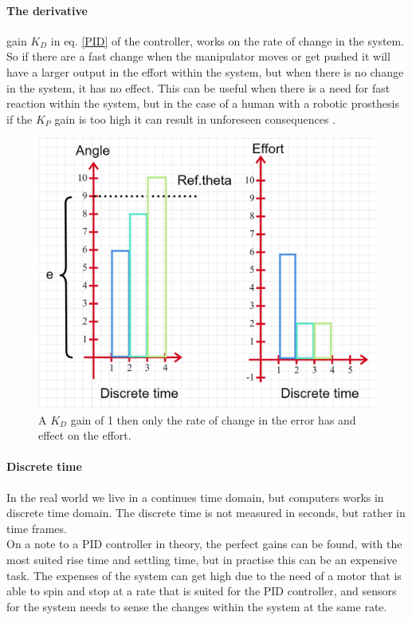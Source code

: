 \paragraph{The derivative} gain $K_D$ in eq. \ref{PID} of the controller, works on the rate of change in the system. So if there are a fast change when the manipulator moves or get pushed it will have a larger output in the effort within the system, but when there is no change in the system, it has no effect. This can be useful when there is a need for fast reaction within the system, but in the case of a human with a robotic prosthesis if the $K_P$ gain is too high it can result in unforeseen consequences .\\ 
\begin{figure}[H]
    \centering
    \includegraphics[width=\textwidth]{Figures/Technical_figures/DGAIN.png} 
    \caption{A $K_D$ gain of 1 then only the rate of change in the error has and effect on the effort.}
    \label{fig:DGain}
\end{figure}

\paragraph{Discrete time} In the real world we live in a continues time domain, but computers works in discrete time domain. The discrete time is not measured in seconds, but rather in time frames.\\

On a note to a PID controller in theory, the perfect gains can be found, with the most suited rise time and settling time, but in practise this can be an expensive task. The expenses of the system can get high due to the need of a motor that is able to spin and stop at a rate that is suited for the PID controller, and sensors for the system needs to sense the changes within the system at the same rate.\\

